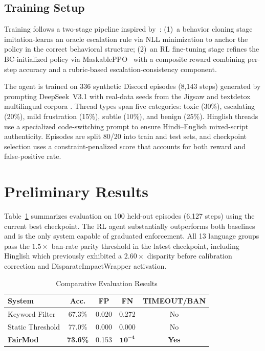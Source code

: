 \documentclass[journal]{IEEEtran}
\begin{document}
\subsection{Training Setup}

Training follows a two-stage pipeline inspired by~\cite{liu2025meta}: (1)~a behavior
cloning stage imitation-learns an oracle escalation rule via NLL minimization to anchor
the policy in the correct behavioral structure; (2)~an RL fine-tuning stage refines the
BC-initialized policy via MaskablePPO~\cite{huang2022mask} with a composite reward
combining per-step accuracy and a rubric-based escalation-consistency component.

The agent is trained on 336 synthetic Discord episodes (8,143 steps) generated by
prompting DeepSeek~V3.1 with real-data seeds from the Jigsaw and textdetox multilingual
corpora \cite{jigsaw, dementieva2023}. Thread types span five categories: toxic (30\%),
escalating (20\%), mild frustration (15\%), subtle (10\%), and benign (25\%).
Hinglish threads use a specialized code-switching prompt to ensure
Hindi--English mixed-script authenticity. Episodes are split 80/20 into train and test
sets, and checkpoint selection uses a constraint-penalized score that accounts for both
reward and false-positive rate.


\section{Preliminary Results}

Table~\ref{tab:results} summarizes evaluation on 100 held-out episodes (6,127
steps) using the current best checkpoint. The RL agent substantially outperforms
both baselines and is the only system capable of graduated enforcement.
All 13 language groups pass the $1.5\times$ ban-rate parity threshold in the
latest checkpoint, including Hinglish which previously exhibited a $2.60\times$
disparity before calibration correction and DisparateImpactWrapper activation.

\begin{table}[!t]
  \renewcommand{\arraystretch}{1.3}
  \caption{Comparative Evaluation Results}
  \label{tab:results}
  \centering
  \begin{tabular}{lcccc}
    \toprule
    System & Acc. & FP & FN & TIMEOUT/BAN \\
    \midrule
    Keyword Filter    & 67.3\% & 0.020 & 0.272 & No \\
    Static Threshold  & 77.0\% & 0.000 & 0.000 & No \\
    \textbf{FairMod}  & \textbf{73.6\%} & 0.153 & $\mathbf{10^{-4}}$ & \textbf{Yes} \\
    \bottomrule
  \end{tabular}
\end{table}
\end{document}
